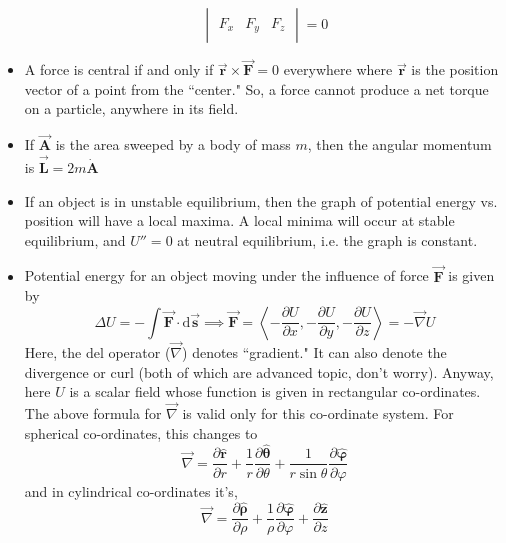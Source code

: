 \documentclass{scrartcl}
\begin{document}
\begin{itemize}
\[\begin{vmatrix}
            \\F_x & F_y & F_z \\
        \end{vmatrix}=0\]
        \item A force is central if and only if $\vec{\mathbf r}\times\vec{\mathbf F}=0$ everywhere where $\vec{\mathbf r}$ is the position vector of a point from the ``center." So, a force cannot produce a net torque on a particle, anywhere in its field.
        \item If $\vec{{\mathbf A}}$ is the area sweeped by a body of mass $m$, then the angular momentum is $\vec{\mathbf L}=2m\dot{\mathbf A}$
        \item If an object is in unstable equilibrium, then the graph of potential energy vs. position will have a local maxima. A local minima will occur at stable equilibrium, and $U''=0$ at neutral equilibrium, i.e. the graph is constant.
        \item Potential energy for an object moving under the influence of  force $\vec{\mathbf F}$ is given by \[\Delta U=-\int \vec{\mathbf F}\cdot\mathrm d\vec{\mathbf s}\implies\vec{\mathbf F}=\left\langle-\frac{\partial U}{\partial x},-\frac{\partial U}{\partial y},-\frac{\partial U}{\partial z}\right\rangle=-\vec\nabla U\] Here, the del operator ($\vec\nabla$) denotes ``gradient." It can also denote the divergence or curl (both of which are advanced topic, don't worry). Anyway, here $U$ is a scalar field whose function is given in rectangular co-ordinates. The above formula for $\vec\nabla$ is valid only for this co-ordinate system. For spherical co-ordinates, this changes to \[\vec\nabla=\frac{\partial\hat{\mathbf r}}{\partial r}+\frac1r\frac{\partial\hat{\mathbf{\theta}}}{\partial \theta}+\frac1{r\sin\theta}\frac{\partial\hat{\mathbf{\varphi}}}{\partial\varphi}\] and in cylindrical co-ordinates it's, \[\vec\nabla=\frac{\partial\hat{\mathbf{\rho}}}{\partial\rho}+\frac1\rho\frac{\partial\hat{\mathbf{\varphi}}}{\partial\varphi}+\frac{\partial\hat{\mathbf z}}{\partial z}\]
        \begin{figure}[H]
            \centering
            \begin{minipage}[b]{0.4\textwidth}

\end{minipage}
\end{figure}
\end{itemize}
\end{document}
